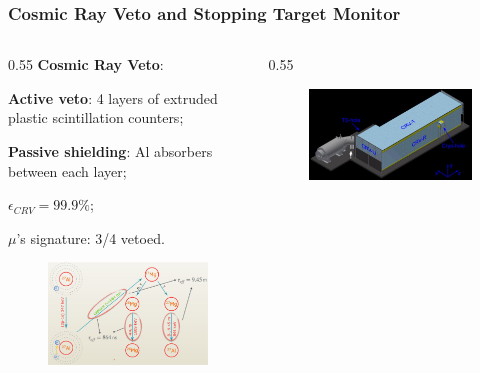 \documentclass{beamer}
\begin{document}
\begin{frame}
    \frametitle{Cosmic Ray Veto and Stopping Target Monitor}
    \vspace{-2mm}
 \begin{columns}
            \begin{column}{0.55\framewidth}
                     \textbf{Cosmic Ray Veto}:
         \begin{itemize}
        {\small \item \textbf{Active veto}: 4 layers of extruded plastic scintillation counters;
                \item \textbf{Passive shielding}: Al absorbers between each layer;
                \item $\epsilon_{CRV}=99.9\%$;
               \item $\mu$'s signature: 3/4 vetoed.}
            \end{itemize}
             \begin{figure}[h]
            \centering
            \includegraphics[width=0.9\columnwidth ]{figures/png/Screenshot_20240706_094517.png}
        \end{figure}
            \end{column}
            \begin{column}{0.55\framewidth}
            \begin{figure}[h]
            \centering
            \includegraphics[width=0.8\columnwidth ]{figures/jpg/Crv_downstream.jpg}

\end{figure}
\end{column}
\end{columns}
\end{frame}
\end{document}
